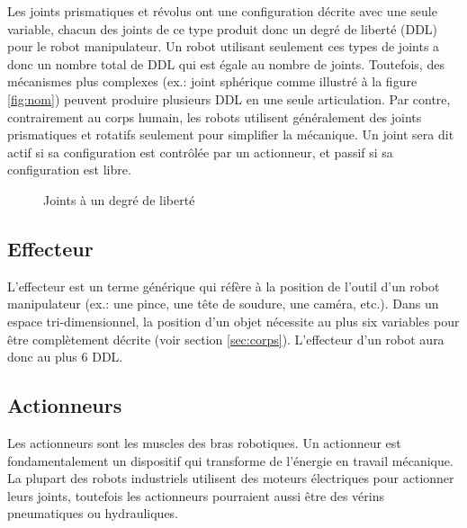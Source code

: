 Les joints prismatiques et révolus ont une configuration décrite avec une seule variable, chacun des joints de ce type produit donc un degré de liberté (DDL) pour le robot manipulateur. Un robot utilisant seulement ces types de joints a donc un nombre total de DDL qui est égale au nombre de joints. Toutefois, des mécanismes plus complexes (ex.: joint sphérique comme illustré à la figure \ref{fig:nom}) peuvent produire plusieurs DDL en une seule articulation. Par contre, contrairement au corps humain, les robots utilisent généralement des joints prismatiques et rotatifs seulement pour simplifier la mécanique. Un joint sera dit actif si sa configuration est contrôlée par un actionneur, et passif si sa configuration est libre.
\begin{figure}[H]
        \centering
        \caption{Joints à un degré de liberté}
				\label{fig:joint}
\end{figure}

\subsection{Effecteur}

L'effecteur est un terme générique qui réfère à la position de l'outil d'un robot manipulateur (ex.: une pince, une tête de soudure, une caméra, etc.). Dans un espace tri-dimensionnel, la position d'un objet nécessite au plus six variables pour être complètement décrite (voir section \ref{sec:corps}). L'effecteur d'un robot aura donc au plus 6 DDL. 

\subsection{Actionneurs}

Les actionneurs sont les muscles des bras robotiques. Un actionneur est fondamentalement un dispositif qui transforme de l'énergie en travail mécanique. La plupart des robots industriels utilisent des moteurs électriques pour actionner leurs joints, toutefois les actionneurs pourraient aussi être des vérins pneumatiques ou hydrauliques. 

